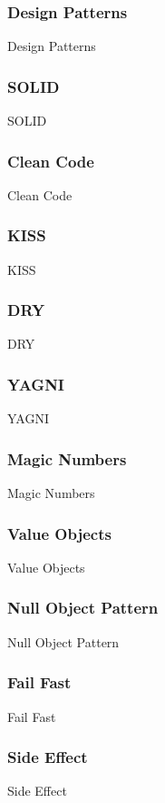 \subsubsection{Design Patterns}
Design Patterns

\subsubsection{SOLID}
SOLID

\subsubsection{Clean Code}
Clean Code

\subsubsection{KISS}
KISS

\subsubsection{DRY}
DRY

\subsubsection{YAGNI}
YAGNI

\subsubsection{Magic Numbers}
Magic Numbers

\subsubsection{Value Objects}
Value Objects

\subsubsection{Null Object Pattern}
Null Object Pattern

\subsubsection{Fail Fast}
Fail Fast

\subsubsection{Side Effect}
Side Effect


